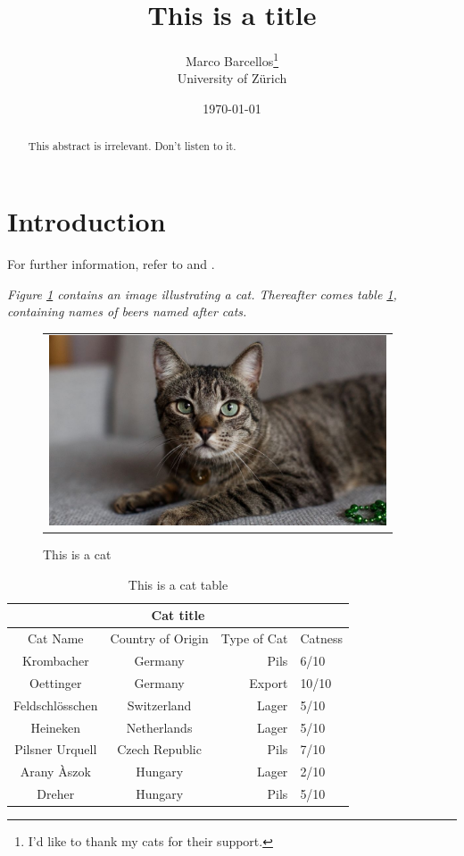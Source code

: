 \documentclass{article}
\begin{document}
\title{This is a title}
\author{Marco Barcellos\thanks{I'd like to thank my cats for their support.} \\ \normalsize{University of Zürich}}
\date{\today}
\maketitle
\begin{abstract}
This abstract is irrelevant. Don't listen to it.
\end{abstract}
\section{Introduction}
\Blindtext
For further information, refer to \cite{corona} and \cite{Tail}.
\par

\emph{Figure \ref{figure1} contains an image illustrating a cat. Thereafter comes table \ref{table:1}, containing names of beers named after cats.}
\newpage

	\begin{figure}[htb]\center 
		\begin{tabular}{c}
			\includegraphics[width = 10cm]{cat.jpg}
		\end{tabular}
		\caption{\footnotesize This is a cat}
		\label{figure1}
	\end{figure}


\begin{table}[h!]
\center
\begin{tabular}{ |c||c|r|l|  }
 \hline
 \multicolumn{4}{|c|}{Cat title} \\
 \hline
 Cat Name & Country of Origin &Type of Cat&Catness\\
 \hline
 Krombacher   & Germany    & Pils &   6/10\\
 Oettinger&   Germany  & Export   &10/10\\
 Feldschlösschen &Switzerland & Lager &  5/10\\
 Heineken    &Netherlands & Lager &  5/10\\
 Pilsner Urquell&   Czech Republic  & Pils & 7/10\\
 Arany Àszok& Hungary  & Lager   & 2/10\\
 Dreher& Hungary  & Pils & 5/10\\
 \hline
 \end{tabular}
 \caption{This is a cat table}
 \label{table:1}
\end{table}



\printbibliography
\end{document}
